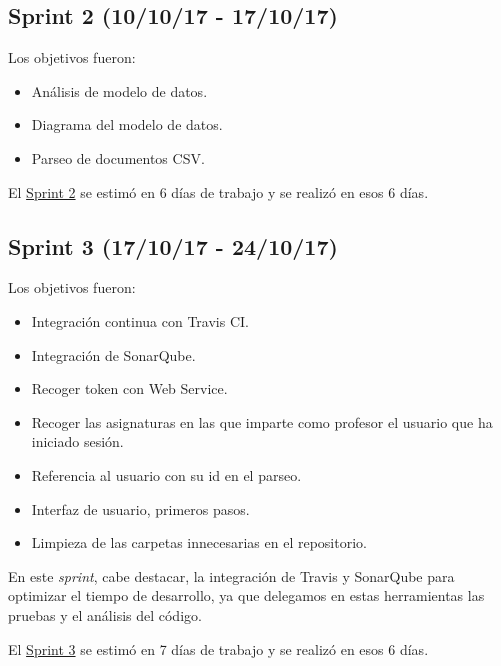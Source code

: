 \newpage
\subsection{Sprint 2 (10/10/17 -
	17/10/17)}\label{sprint-2-101017---171017}

Los objetivos fueron:
\begin{itemize}
	\tightlist
	\item
	Análisis de modelo de datos.
	\item
	Diagrama del modelo de datos.
	\item
	Parseo de documentos CSV.	
	
\end{itemize}

El \href{https://github.com/trona85/GII-17.1B-UBULog-1.0/milestone/2?closed=1}{Sprint 2} se estimó en 6 días de trabajo y se realizó en esos 6 días.

\newpage
\subsection{Sprint 3 (17/10/17 -
	24/10/17)}\label{sprint-3-171017---241017}

Los objetivos fueron:
\begin{itemize}
	\tightlist
	\item
	Integración continua con Travis CI.
	\item
	Integración de  SonarQube.
	\item
	Recoger token con Web Service.	
	\item
	Recoger las asignaturas en las que imparte como profesor el usuario que ha iniciado sesión.
	\item
	Referencia al usuario con su id en el parseo.
	\item
	Interfaz de usuario, primeros pasos.
	\item
	Limpieza de las carpetas innecesarias en el repositorio.
	
\end{itemize}

En este \emph{sprint}, cabe destacar, la integración de Travis\cite{web:travis} y SonarQube \cite{web:sonarqube} para optimizar el tiempo de desarrollo, ya que delegamos en estas herramientas las pruebas y el análisis del código.

El \href{https://github.com/trona85/GII-17.1B-UBULog-1.0/milestone/3?closed=1}{Sprint 3} se estimó en 7 días de trabajo y se realizó en esos 6 días.

